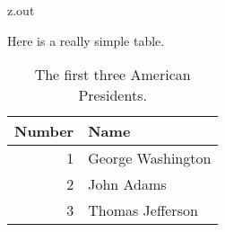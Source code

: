 

\begin{VerbatimOut}{z.out}

Here is a really simple table.

\begin{table}[ht]
  \caption{The first three American Presidents.}
  \vspace*{6pt}
  \centering
    \begin{tabular}{@{}rl@{}}
      \toprule
      \bf Number& \bf Name\\
      \midrule
      1& George Washington\\
      2& John Adams\\
      3& Thomas Jefferson\\
      \bottomrule
    \end{tabular}
  \label{ta:first-three-american-presidents}
\end{table}
\end{VerbatimOut}

\MyIOS


